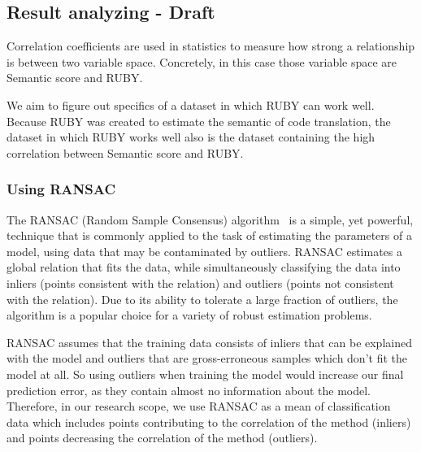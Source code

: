 \subsection{Result analyzing - Draft}

Correlation coefficients are used in statistics to measure how strong a relationship is between two variable space. Concretely, in this case those variable space are Semantic score and RUBY. 


We aim to figure out specifics of a dataset in which RUBY can work well. Because RUBY was created to estimate the semantic of code translation, the dataset in which RUBY works well also is the dataset containing the high correlation between Semantic score and RUBY. 

\subsubsection{Using RANSAC}
The RANSAC (Random Sample Consensus) algorithm~\cite{ Fischler:1981:RSC:358669.358692} is a simple, yet powerful, technique that is commonly applied to the task of estimating the parameters of a model, using data that may be contaminated by outliers. RANSAC estimates a global relation that fits the data, while simultaneously classifying the data into inliers (points consistent with the relation) and outliers (points not consistent with the relation). Due to its ability to tolerate a large fraction of outliers, the algorithm is a popular choice for a variety of robust estimation problems.


RANSAC assumes that the training data consists of inliers that can be explained with the model and outliers that are gross-erroneous samples which don't fit the model at all. So using outliers when training the model would increase our final prediction error, as they contain almost no information about the model. Therefore, in our research scope, we use RANSAC as a mean of classification data which includes points contributing to the correlation of the method (inliers) and points decreasing the correlation of the method (outliers).


